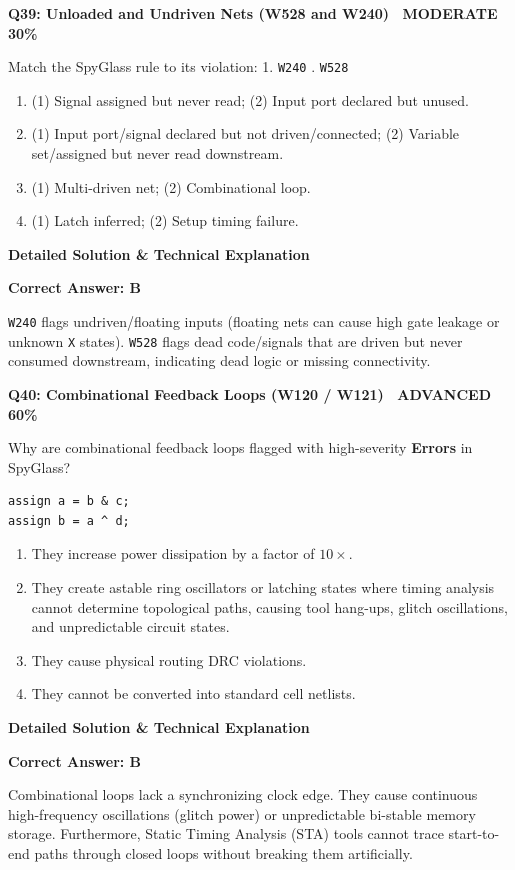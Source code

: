 \documentclass[11pt,a4paper]{article}
\newcommand{\badgeadv}{{\color{white}\colorbox{advred}{\bfseries\sffamily\tiny\ ADVANCED 60\%\ }}}
\newcommand{\badgemod}{{\color{white}\colorbox{modoran}{\bfseries\sffamily\tiny\ MODERATE 30\%\ }}}
\newenvironment{qbox}[2]{%
  \begin{mdframed}[style=qstyle]%
  {\bfseries\sffamily\color{primaryblue}#1 \hfill #2}\par\vspace{2pt}%
}{%
  \end{mdframed}%
}
\newenvironment{ansbox}{%
  \begin{mdframed}[style=ansstyle]%
  {\bfseries\sffamily\color{ansgreen}\small Detailed Solution \& Technical Explanation}\par\vspace{2pt}\small%
}{%
  \end{mdframed}%
}
\begin{document}
\begin{qbox}{Q39: Unloaded and Undriven Nets (W528 and W240)}{\badgemod}
Match the SpyGlass rule to its violation:
1. \texttt{W240} . \texttt{W528}
\begin{enumerate}[label=\textbf{\Alph*.}]
  \item (1) Signal assigned but never read; (2) Input port declared but unused.
  \item (1) Input port/signal declared but not driven/connected; (2) Variable set/assigned but never read downstream.
  \item (1) Multi-driven net; (2) Combinational loop.
  \item (1) Latch inferred; (2) Setup timing failure.
\end{enumerate}
\end{qbox}
\begin{ansbox}
\textbf{Correct Answer: B}

\texttt{W240} flags undriven/floating inputs (floating nets can cause high gate leakage or unknown \texttt{X} states). \texttt{W528} flags dead code/signals that are driven but never consumed downstream, indicating dead logic or missing connectivity.
\end{ansbox}

\begin{qbox}{Q40: Combinational Feedback Loops (W120 / W121)}{\badgeadv}
Why are combinational feedback loops flagged with high-severity \textbf{Errors} in SpyGlass?
\begin{lstlisting}[style=verilogstyle]
assign a = b & c;
assign b = a ^ d;
\end{lstlisting}
\begin{enumerate}[label=\textbf{\Alph*.}]
  \item They increase power dissipation by a factor of $10\times$.
  \item They create astable ring oscillators or latching states where timing analysis cannot determine topological paths, causing tool hang-ups, glitch oscillations, and unpredictable circuit states.
  \item They cause physical routing DRC violations.
  \item They cannot be converted into standard cell netlists.
\end{enumerate}
\end{qbox}
\begin{ansbox}
\textbf{Correct Answer: B}

Combinational loops lack a synchronizing clock edge. They cause continuous high-frequency oscillations (glitch power) or unpredictable bi-stable memory storage. Furthermore, Static Timing Analysis (STA) tools cannot trace start-to-end paths through closed loops without breaking them artificially.
\end{ansbox}
\end{document}

